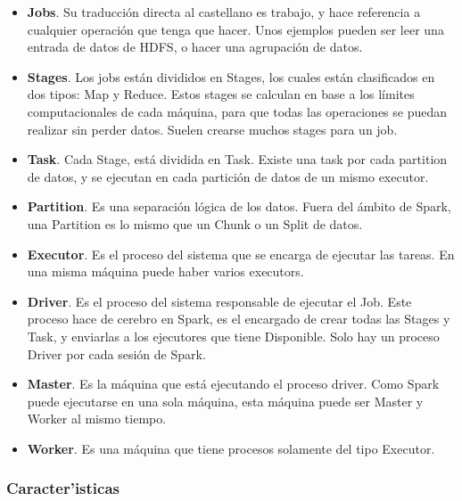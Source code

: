 \begin{itemize}


\item \textbf{Jobs}. Su traducción directa al castellano  es trabajo, y hace referencia a cualquier operación que tenga que hacer. Unos ejemplos pueden ser leer una entrada de datos de HDFS, o hacer una agrupación de datos.

\item \textbf{Stages}. Los jobs están divididos en Stages, los cuales están clasificados en dos tipos: Map y Reduce. Estos stages se calculan en base a los límites computacionales de cada máquina, para que todas las operaciones se puedan realizar sin perder datos. Suelen crearse muchos stages para un job.

\item \textbf{Task}. Cada Stage, está dividida en Task. Existe una task por cada partition de datos, y se ejecutan en cada partición de datos de un mismo executor.

\item \textbf{Partition}. Es una separación lógica de los datos. Fuera del ámbito de Spark, una Partition es lo mismo que un Chunk o un Split de datos.

\item \textbf{Executor}. Es el proceso del sistema que se encarga de ejecutar las tareas. En una misma máquina puede haber varios executors.

\item \textbf{Driver}. Es el proceso del sistema responsable de ejecutar el Job. Este proceso hace de cerebro en Spark, es el encargado de crear todas las Stages y Task, y enviarlas a los ejecutores que tiene Disponible. Solo hay un proceso Driver por cada sesión de Spark.

\item \textbf{Master}. Es la máquina que está ejecutando el proceso driver. Como Spark puede ejecutarse en una sola máquina, esta máquina puede ser Master y Worker al mismo tiempo.
 
\item \textbf{Worker}. Es una máquina que tiene procesos solamente del tipo Executor. 

\end{itemize}

\clearpage


\subsubsection{Caracter'isticas}

